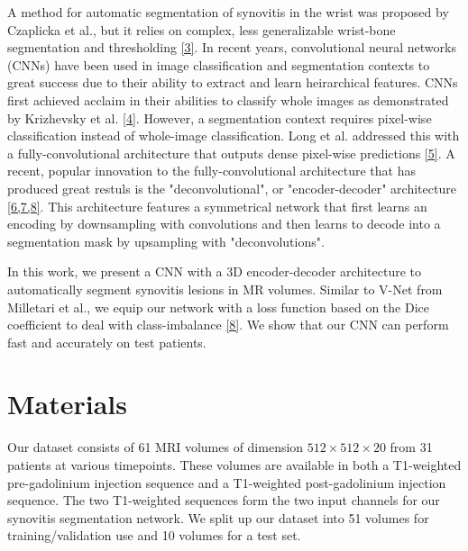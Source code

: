 \documentclass[11pt]{article}
\begin{document}
A method for automatic segmentation of synovitis in the wrist was proposed by Czaplicka et al., but it relies on complex, less generalizable wrist-bone segmentation and thresholding \hyperref[cza]{[3]}. In recent years, convolutional neural networks (CNNs) have been used in image classification and segmentation contexts to great success due to their ability to extract and learn heirarchical features. CNNs first achieved acclaim in their abilities to classify whole images as demonstrated by Krizhevsky et al. \hyperref[kriz]{[4]}. However, a segmentation context requires pixel-wise classification instead of whole-image classification. Long et al. addressed this with a fully-convolutional architecture that outputs dense pixel-wise predictions \hyperref[long]{[5]}. A recent, popular innovation to the fully-convolutional architecture that has produced great restuls is the "deconvolutional", or "encoder-decoder" architecture \hyperref[noh]{[6,7,8]}. This architecture features a symmetrical network that first learns an encoding by downsampling with convolutions and then learns to decode into a segmentation mask by upsampling with "deconvolutions". 

In this work, we present a CNN with a 3D encoder-decoder architecture to automatically segment synovitis lesions in MR volumes. Similar to V-Net from Milletari et al., we equip our network with a loss function based on the Dice coefficient to deal with class-imbalance \hyperref[vnet]{[8]}. We show that our CNN can perform fast and accurately on test patients. 

\section{Materials}

Our dataset consists of 61 MRI volumes of dimension $512 \times 512 \times 20$ from 31 patients at various timepoints. These volumes are available in both a T1-weighted pre-gadolinium injection sequence and a T1-weighted post-gadolinium injection sequence. The two T1-weighted sequences form the two input channels for our synovitis segmentation network. We split up our dataset into 51 volumes for training/validation use and 10 volumes for a test set. 

\newpage
\end{document}
